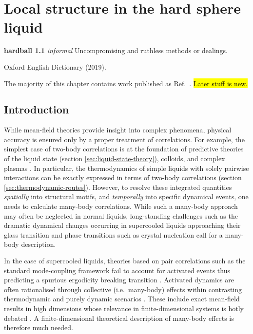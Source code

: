 \documentclass[11pt,twoside]{report}
\begin{document}
\chapter{Local structure in the hard sphere liquid}
\epigraph{\textbf{hardball 1.1} \emph{informal} Uncompromising and ruthless methods or dealings.}{Oxford English Dictionary (2019).}
\label{chapter:morphometric-applications}

The majority of this chapter contains work published as Ref.\ \cite{RobinsonPRL2019}.
\hl{Later stuff is new.}

\section{Introduction}

While mean-field theories provide insight into complex phenomena, physical accuracy is ensured only by a proper treatment of correlations.
For example, the simplest case of two-body correlations is at the foundation of predictive theories of the liquid state (section \ref{sec:liquid-state-theory}), colloids, and complex plasmas \cite{LikosPR2001,Ivlev2012}.
In particular, the thermodynamics of simple liquids with solely pairwise interactions can be exactly expressed in terms of two-body correlations (section \ref{sec:thermodynamic-routes}).
However, to resolve these integrated quantities \emph{spatially} into structural motifs, and \emph{temporally} into specific dynamical events, one needs to calculate many-body correlations.
While such a many-body approach may often be neglected in normal liquids, long-standing challenges such as the dramatic dynamical changes occurring in supercooled liquids approaching their glass transition \cite{BerthierRMP2011,RoyallPR2015} and phase transitions such as crystal nucleation \cite{RussoSR2012} call for a many-body description.

In the case of supercooled liquids, theories based on pair correlations such as the standard mode-coupling framework \cite{Gotze2009} fail to account for activated events thus predicting a spurious ergodicity breaking transition \cite{BrambillaPRL2009,HallettNC2018}.
Activated dynamics are often rationalised through collective (i.e.\ many-body) effects within contrasting thermodynamic and purely dynamic scenarios \cite{LubchenkoARPC2007,TarjusJPCM2005,BiroliPRL2006,JanssenPRL2015,SzamelPTEP2013,ChandlerARPC2010}.
These include exact mean-field results in high dimensions \cite{ParisiRMP2010,CharbonneauARCMP2017} whose relevance in finite-dimensional systems is hotly debated \cite{WyartPRL2017}.
A finite-dimensional theoretical description of many-body effects is therefore much needed.
\end{document}
